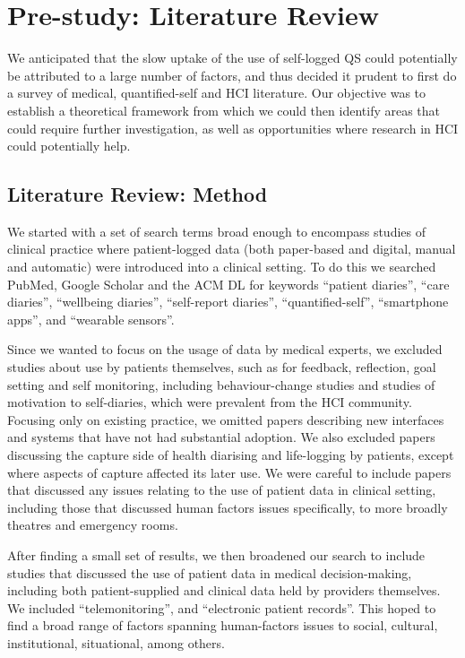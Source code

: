 \documentclass{sigchi}
\begin{document}
\section{Pre-study: Literature Review} 

We anticipated that the slow uptake of the use of self-logged QS could potentially be attributed to a large number of factors, and thus decided it prudent to first do a survey of medical, quantified-self and HCI literature.  Our objective  was to establish a theoretical framework from which we could then identify areas that could require further investigation, as well as opportunities where research in HCI could potentially help.  

\subsection{Literature Review: Method}

We started with a set of search terms broad enough to encompass studies of clinical practice where patient-logged data (both paper-based and digital, manual and automatic) were introduced into a clinical setting.  To do this we searched PubMed, Google Scholar and the ACM DL for keywords ``patient diaries'', ``care diaries'', ``wellbeing diaries'', ``self-report diaries'', ``quantified-self'', ``smartphone apps'', and ``wearable sensors''.

Since we wanted to focus on the usage of data by medical experts, we excluded studies about use by patients themselves, such as for feedback, reflection, goal setting and self monitoring, including behaviour-change studies and studies of motivation to self-diaries, which were prevalent from the HCI community.   Focusing only on existing practice, we omitted papers describing new interfaces and systems that have not had substantial adoption.  We also excluded papers discussing the capture side of health diarising and life-logging by patients, except where aspects of capture affected its later use.  We were careful to include papers that discussed any issues relating to the use of patient data in clinical setting, including those that discussed human factors issues specifically, to more broadly  theatres and emergency rooms.

After finding a small set of results, we then broadened our search to include studies that discussed the use of patient data in medical decision-making, including both patient-supplied and clinical data held by providers themselves.  We included ``telemonitoring'', and ``electronic patient records''.  This  hoped to find a broad range of factors spanning human-factors issues to social, cultural, institutional, situational, among others.
\end{document}
